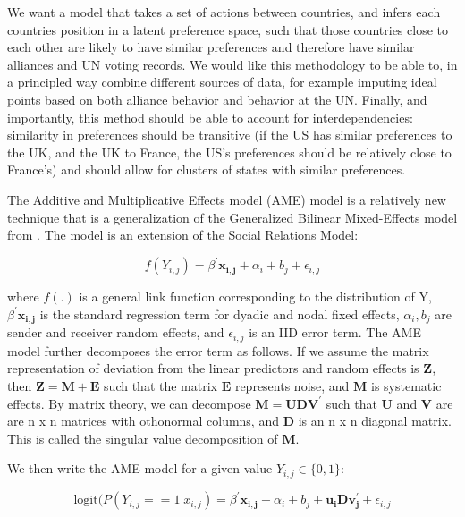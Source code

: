 We want a model that takes a set of actions between countries, and infers each countries position in a latent preference space, such that those countries close to each other are likely to have similar preferences and therefore have similar alliances and UN voting records. We would like this methodology to be able to, in a principled way combine different sources of data, for example imputing ideal points based on both alliance behavior and behavior at the UN. Finally, and importantly, this method should be able to account for interdependencies: similarity in preferences should be transitive (if the US has similar preferences to the UK, and the UK to France, the US's preferences should be relatively close to France's) and should allow for clusters of states with similar preferences.

The Additive and Multiplicative Effects model (AME) model is a relatively new technique that is a generalization of the Generalized Bilinear Mixed-Effects model from \citet{hoff:2005}. The model is an extension of the Social Relations Model: 

\begin{equation}
	f(Y_{i,j}) =  \beta^{'}\mathbf{x_{i,j}} + \alpha_{i} + b_{j} + \epsilon_{i,j}
\end{equation}

where $f(.)$ is a general link function corresponding to the distribution of Y, $\beta^{'}\mathbf{x_{i,j}}$ is the standard regression term for dyadic and nodal fixed effects,  $\alpha_{i}, b_{j}$ are sender and receiver random effects, and $\epsilon_{i,j}$ is an IID error term. The AME model further decomposes the  error term as follows. If we assume the matrix representation of deviation from the linear predictors and random effects is $\mathbf{Z}$, then $\mathbf{Z} = \mathbf{M} + \mathbf{E}$ such that the matrix $\mathbf{E}$ represents noise, and $\mathbf{M}$ is systematic effects. By matrix theory, we can decompose $\mathbf{M} = \mathbf{UDV^{'}}$ such that $\mathbf{U}$ and $\mathbf{V}$ are are n x n matrices with othonormal columns, and $\mathbf{D}$ is an n x n diagonal matrix. This is called the singular value decomposition of $\mathbf{M}$. 

We then write the AME model for a given value $Y_{i,j} \in \{0,1\}$:

\begin{equation}
	\text{logit}(P(Y_{i,j} == 1| x_{i,j}) = \beta^{'}\mathbf{x_{i,j}} + \alpha_{i} + b_{j} + \mathbf{u_{i}Dv^{'}_{j}} + \epsilon_{i,j}
\end{equation}

